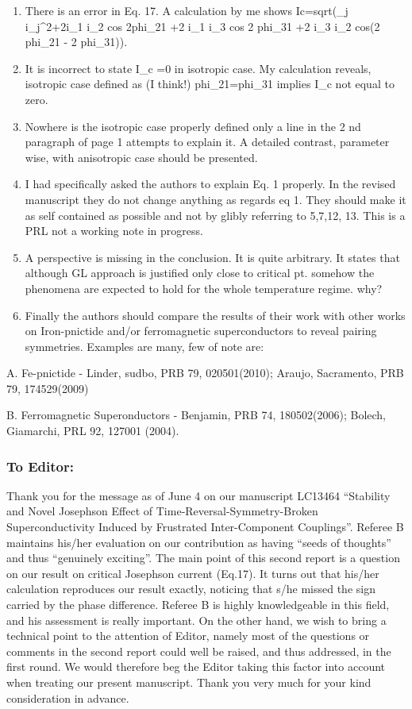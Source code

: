 \documentclass[11pt]{article}
\begin{document}
\begin{enumerate}
\def\labelenumi{\arabic{enumi}.}
\item
  There is an error in Eq. 17. A calculation by me shows Ic=sqrt(\sum\_j
  i\_j\^{}2+2i\_1 i\_2 cos 2phi\_21 +2 i\_1 i\_3 cos 2 phi\_31 +2 i\_3
  i\_2 cos(2 phi\_21 - 2 phi\_31)).
\item
  It is incorrect to state I\_c =0 in isotropic case. My calculation
  reveals, isotropic case defined as (I think!) phi\_21=phi\_31 implies
  I\_c not equal to zero.
\item
  Nowhere is the isotropic case properly defined only a line in the 2 nd
  paragraph of page 1 attempts to explain it. A detailed contrast,
  parameter wise, with anisotropic case should be presented.
\item
  I had specifically asked the authors to explain Eq. 1 properly. In the
  revised manuscript they do not change anything as regards eq 1. They
  should make it as self contained as possible and not by glibly
  referring to 5,7,12, 13. This is a PRL not a working note in progress.
\item
  A perspective is missing in the conclusion. It is quite arbitrary. It
  states that although GL approach is justified only close to critical
  pt. somehow the phenomena are expected to hold for the whole
  temperature regime. why?
\item
  Finally the authors should compare the results of their work with
  other works on Iron-pnictide and/or ferromagnetic superconductors to
  reveal pairing symmetries. Examples are many, few of note are:
\end{enumerate}

A. Fe-pnictide - Linder, sudbo, PRB 79, 020501(2010); Araujo,
Sacramento, PRB 79, 174529(2009)

B. Ferromagnetic Superonductors - Benjamin, PRB 74, 180502(2006);
Bolech, Giamarchi, PRL 92, 127001 (2004).

\hypertarget{to-editor}{%
\subsubsection{To Editor:}\label{to-editor}}

Thank you for the message as of June 4 on our manuscript LC13464
``Stability and Novel Josephson Effect of Time-Reversal-Symmetry-Broken
Superconductivity Induced by Frustrated Inter-Component Couplings''.
Referee B maintains his/her evaluation on our contribution as having
``seeds of thoughts'' and thus ``genuinely exciting''. The main point of
this second report is a question on our result on critical Josephson
current (Eq.17). It turns out that his/her calculation reproduces our
result exactly, noticing that s/he missed the sign carried by the phase
difference. Referee B is highly knowledgeable in this field, and his
assessment is really important. On the other hand, we wish to bring a
technical point to the attention of Editor, namely most of the questions
or comments in the second report could well be raised, and thus
addressed, in the first round. We would therefore beg the Editor taking
this factor into account when treating our present manuscript. Thank you
very much for your kind consideration in advance.
\end{document}
